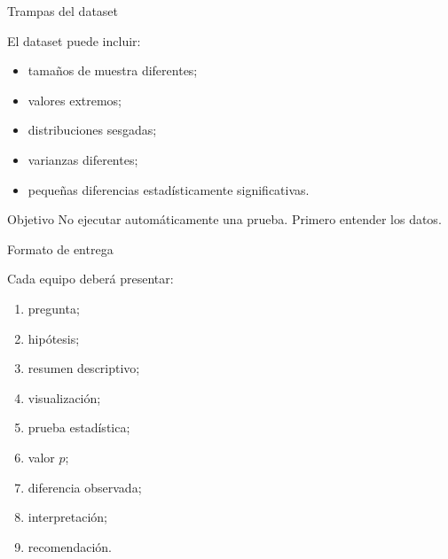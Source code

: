 \documentclass[aspectratio=169,11pt]{beamer}
\begin{document}
\begin{frame}{Trampas del dataset}

El dataset puede incluir:

\begin{itemize}

    \item tamaños de muestra diferentes;

    \item valores extremos;

    \item distribuciones sesgadas;

    \item varianzas diferentes;

    \item pequeñas diferencias estadísticamente significativas.

\end{itemize}

\vspace{0.4cm}

\begin{alertblock}{Objetivo}
No ejecutar automáticamente una prueba.
Primero entender los datos.
\end{alertblock}

\end{frame}


\begin{frame}{Formato de entrega}

Cada equipo deberá presentar:

\begin{enumerate}

    \item pregunta;

    \item hipótesis;

    \item resumen descriptivo;

    \item visualización;

    \item prueba estadística;

    \item valor $p$;

    \item diferencia observada;

    \item interpretación;

    \item recomendación.

\end{enumerate}

\end{frame}
\end{document}
